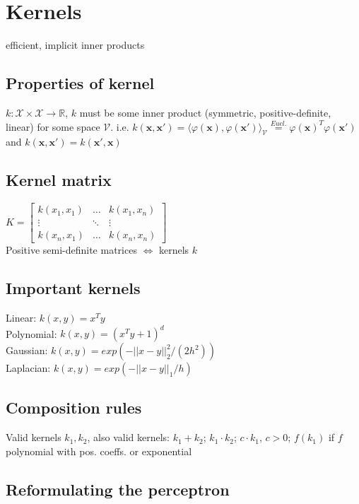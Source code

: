 
\section*{Kernels}

efficient, implicit inner products

\subsection*{Properties of kernel}
$k: \mathcal{X} \times \mathcal{X} \rightarrow \mathbb{R}$, $k$ must be some inner product (symmetric, positive-definite, linear) for some space $\mathcal{V}$.
i.e. $k(\mathbf{x}, \mathbf{x'}) = \langle \varphi(\mathbf{x}), \varphi(\mathbf{x'}) \rangle_\mathcal{V} \overset{Eucl.}{=} \varphi(\mathbf{x})^T \varphi(\mathbf{x'}) $
and $k(\mathbf{x}, \mathbf{x}') = k(\mathbf{x}', \mathbf{x})$

\subsection*{Kernel matrix}
$K = 
\begin{bmatrix}
	k(x_1,x_1) & \dots & k(x_1,x_n) \\
	\vdots & \ddots & \vdots \\
	k(x_n, x_1) & \dots & k(x_n,x_n)
\end{bmatrix}$\\
Positive semi-definite matrices $\Leftrightarrow$ kernels $k$

\subsection*{Important kernels}
Linear: $k(x,y)=x^T y$\\
Polynomial: $k(x,y)=(x^T y + 1)^d$\\
Gaussian: $k(x,y) = exp(-||x-y||_2^2/(2h^2))$\\
Laplacian: $k(x,y) = exp(-||x-y||_1/h)$

\subsection*{Composition rules}
Valid kernels $k_1, k_2$, also valid kernels:
$k_1 + k_2$; $k_1 \cdot k_2$; $c \cdot k_1$, $c>0$;
$f(k_1)$ if $f$ polynomial with pos. coeffs. or exponential

\subsection*{Reformulating the perceptron}

